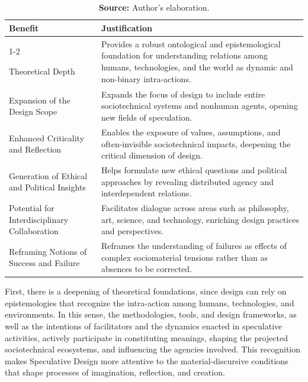 \begin{table}[ht!]
\centering
\scriptsize
\caption{Benefits of Integrating Entanglement Theories and Speculative Design}
\begin{tabular}{p{6cm}p{8cm}}
\toprule
\textbf{Benefit} & \textbf{Justification} \\
\cmidrule[0.4pt]{1-2}

Theoretical Depth & 
Provides a robust ontological and epistemological foundation for understanding relations among humans, technologies, and the world as dynamic and non-binary intra-actions. \\

Expansion of the Design Scope & 
Expands the focus of design to include entire sociotechnical systems and nonhuman agents, opening new fields of speculation. \\

Enhanced Criticality and Reflection & 
Enables the exposure of values, assumptions, and often-invisible sociotechnical impacts, deepening the critical dimension of design. \\

Generation of Ethical and Political Insights & 
Helps formulate new ethical questions and political approaches by revealing distributed agency and interdependent relations. \\

Potential for Interdisciplinary Collaboration & 
Facilitates dialogue across areas such as philosophy, art, science, and technology, enriching design practices and perspectives. \\

Reframing Notions of Success and Failure & 
Reframes the understanding of failures as effects of complex sociomaterial tensions rather than as absences to be corrected. \\

\bottomrule
\end{tabular}
\label{tab:beneficios_emaranhado_de}
\caption*{\textbf{Source:} Author’s elaboration.}
\end{table}


First, there is a deepening of theoretical foundations, since design can rely on epistemologies that recognize the intra-action among humans, technologies, and environments. In this sense, the methodologies, tools, and design frameworks, as well as the intentions of facilitators and the dynamics enacted in speculative activities, actively participate in constituting meanings, shaping the projected sociotechnical ecosystems, and influencing the agencies involved. This recognition makes Speculative Design more attentive to the material-discursive conditions that shape processes of imagination, reflection, and creation.

